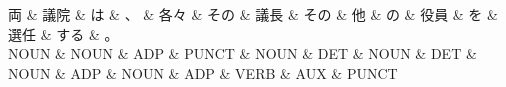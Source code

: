 \documentclass[tikz,border=5pt]{standalone}
\begin{document}
\normalsize
\begin{dependency}[edge unit distance=12.0pt]
    \begin{deptext}[column sep=1em]
        両 \& 議院 \& は \& 、 \& 各々 \& その \& 議長 \& その \& 他 \& の \& 役員 \& を \& 選任 \& する \& 。\\
        NOUN \& NOUN \& ADP \& PUNCT \& NOUN \& DET \& NOUN \& DET \& NOUN \& ADP \& NOUN \& ADP \& VERB \& AUX \& PUNCT\\
    \end{deptext}
\end{dependency}
\end{document}

